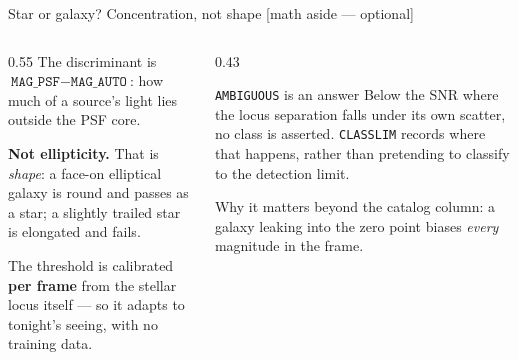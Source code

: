\documentclass[10pt,aspectratio=169]{beamer}
\newcommand{\asidetag}{\hfill{\footnotesize\color{cassablue}[math aside --- optional]}}
\begin{document}
\begin{frame}{Star or galaxy? Concentration, not shape \asidetag}
  \begin{columns}[T]
    \begin{column}{0.55\textwidth}
      The discriminant is $\texttt{MAG\_PSF} - \texttt{MAG\_AUTO}$: how much of a
      source's light lies outside the PSF core.

      \medskip
      \textbf{Not ellipticity.} That is \emph{shape}: a face-on elliptical
      galaxy is round and passes as a star; a slightly trailed star is elongated
      and fails.

      \medskip
      The threshold is calibrated \textbf{per frame} from the stellar locus
      itself --- so it adapts to tonight's seeing, with no training data.
    \end{column}
    \begin{column}{0.43\textwidth}
      \begin{block}{\small \texttt{AMBIGUOUS} is an answer}
        \footnotesize Below the SNR where the locus separation falls under its
        own scatter, no class is asserted. \texttt{CLASSLIM} records where that
        happens, rather than pretending to classify to the detection limit.
      \end{block}
      \medskip
      {\footnotesize Why it matters beyond the catalog column: a galaxy leaking
      into the zero point biases \emph{every} magnitude in the frame.}
    \end{column}
  \end{columns}
\end{frame}
\end{document}
